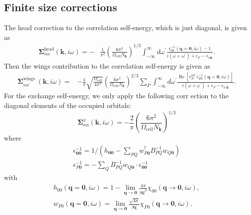\subsection{Finite size corrections}
The head correction to the correlation self-energy, which is just diagonal, is given as
\begin{align}
    \bm{\Sigma}_{n n}^{\mathrm{head}}(\mathbf{k}, i \omega)=- & \frac{1}{\pi^2}\left(\frac{6 \pi^2}{\Omega_{\mathrm{cell}} N_{\mathbf{k}}}\right)^{1 / 3} \int_{-\infty}^{\infty} d \omega^{\prime} \frac{\epsilon_{00}^{-1}(\mathbf{q}=\mathbf{0}, i \omega)-1}{i\left(\omega+\omega^{\prime}\right)+\epsilon_F-\epsilon_{n \mathbf{k}}} . 
\end{align}
Then the wings contribution to the correlation self-energy is given as
\begin{align}
\bm{\Sigma}_{n n^{\prime}}^{\text {wings }}(\mathbf{k}, i \omega)= & -\frac{1}{\pi} \sqrt{\frac{\Omega_{\mathrm{cell}}}{4 \pi^3}}\left(\frac{6 \pi^2}{\Omega_{\mathrm{cell}} N_{\mathbf{k}}}\right)^{2 / 3} \sum_P \int_{-\infty}^{\infty} d \omega^{\prime} \frac{\operatorname{Re}\left[v_P^{n n^{\prime}} \epsilon_{P 0}^{-1}(\mathbf{q}=\mathbf{0}, i \omega)\right]}{i\left(\omega+\omega^{\prime}\right)+\epsilon_F-\epsilon_{n^{\prime} \mathbf{k}}} .
\end{align}
For the exchange self-energy, we only apply the following corr ection to the diagonal elements of the occupied orbitals:
\begin{equation}
    \bm{\Sigma}^x_{n n}(\mathbf{k}, i \omega)=-\frac{2}{\pi}\left(\frac{6 \pi^2}{\Omega_{\mathrm{cell}} N_{\mathbf{k}}}\right)^{1 / 3}
\end{equation}
where
\begin{gather}
    \epsilon_{\mathbf{0 0}}^{-1}=1 /\left(h_{\mathbf{0 0}}-\sum_{P Q} w_{P \mathbf{0}}^{\dagger} B_{P Q}^{-1} w_{Q \mathbf{0}}\right) \\
\epsilon_{P \mathbf{0}}^{-1}=-\sum_{Q} B_{P Q}^{-1} w_{Q \mathbf{0}} \cdot \epsilon_{\mathbf{0 0}}^{-1}
\end{gather}
with 
\begin{align}
     h_{00}(\mathbf{q}=\mathbf{0}, i \omega)=1-\lim _{\mathbf{q} \rightarrow \mathbf{0}} \frac{4 \pi}{|\mathbf{q}|^2} \chi_{00}(\mathbf{q} \rightarrow \mathbf{0}, i \omega),  \\
 w_{P 0}(\mathbf{q}=\mathbf{0}, i \omega)=\lim _{\mathbf{q} \rightarrow \mathbf{0}} \frac{\sqrt{4 \pi}}{|\mathbf{q}|} \chi_{P 0}(\mathbf{q} \rightarrow \mathbf{0}, i \omega).
\end{align}
